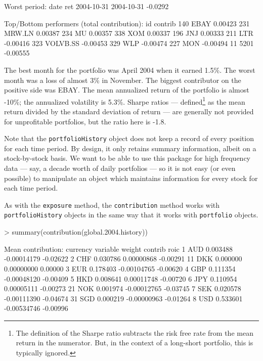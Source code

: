 \documentclass[a4paper]{report}
\begin{document}
\begin{article}
\begin{Schunk}
\begin{Soutput}
Worst period:
                 date     ret
2004-10-31 2004-10-31 -0.0292

Top/Bottom performers (total contribution):
          id  contrib
140     EBAY  0.00423
231   MRW.LN  0.00387
234       MU  0.00357
338      XOM  0.00337
196      JNJ  0.00333
211      LTR -0.00416
323 VOLVB.SS -0.00453
329      WLP -0.00474
227      MON -0.00494
11      5201 -0.00555
\end{Soutput}
\end{Schunk}

The best month for the portfolio was April 2004 when it earned 1.5\%.
The worst month was a loss of almost 3\% in November. The biggest
contributor on the positive side was EBAY. The mean annualized return
of the portfolio is almost -10\%; the annualized volatility is
5.3\%. Sharpe ratios --- defined\footnote{The definition of the Sharpe
  ratio subtracts the risk free rate from the mean return in the
  numerator. But, in the context of a long-short portfolio, this is
  typically ignored.} as the mean return divided by the standard
deviation of return --- are generally not provided for unprofitable
portfolios, but the ratio here is -1.8.

Note that the \texttt{portfolioHistory} object does not keep a record
of every position for each time period. By design, it only retains
summary information, albeit on a stock-by-stock basis. We want to be
able to use this package for high frequency data --- say, a decade
worth of daily portfolios --- so it is not easy (or even possible) to
manipulate an object which maintains information for every stock for
each time period.

As with the \texttt{exposure} method, the \texttt{contribution} method
works with \texttt{portfolioHistory} objects in the same way that it
works with \texttt{portfolio} objects.

\begin{Schunk}
\begin{Sinput}
> summary(contribution(global.2004.history))
\end{Sinput}
\begin{Soutput}
Mean contribution:
currency 
   variable   weight     contrib     roic
1       AUD 0.003488 -0.00014179 -0.02622
2       CHF 0.030786  0.00000868 -0.00291
11      DKK 0.000000  0.00000000  0.00000
3       EUR 0.178403 -0.00104765 -0.00620
4       GBP 0.111354 -0.00048120 -0.00409
5       HKD 0.008641  0.00011748 -0.00720
6       JPY 0.110954  0.00005111 -0.00273
21      NOK 0.001974 -0.00012765 -0.03745
7       SEK 0.020578 -0.00111390 -0.04674
31      SGD 0.000219 -0.00000963 -0.01264
8       USD 0.533601 -0.00534746 -0.00996


\end{Soutput}
\end{Schunk}
\end{article}
\end{document}
